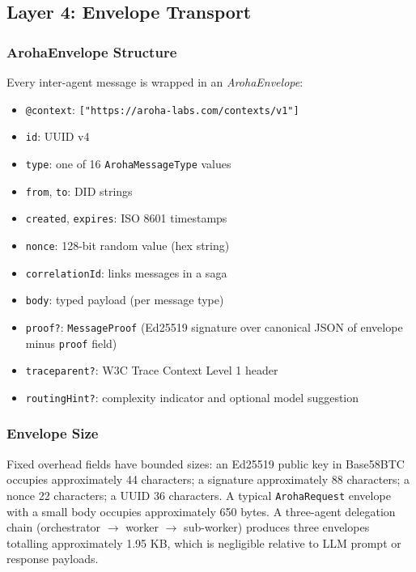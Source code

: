 \documentclass[conference]{IEEEtran}
\begin{document}
\subsection{Layer 4: Envelope Transport}
\label{sec:l4}

\subsubsection{ArohaEnvelope Structure}

Every inter-agent message is wrapped in an \textit{ArohaEnvelope}:
\begin{itemize}
  \item \texttt{@context}: \texttt{["https://aroha-labs.com/}\allowbreak\texttt{contexts/v1"]}
  \item \texttt{id}: UUID v4
  \item \texttt{type}: one of 16 \texttt{ArohaMessageType} values
  \item \texttt{from}, \texttt{to}: DID strings
  \item \texttt{created}, \texttt{expires}: ISO 8601 timestamps
  \item \texttt{nonce}: 128-bit random value (hex string)
  \item \texttt{correlationId}: links messages in a saga
  \item \texttt{body}: typed payload (per message type)
  \item \texttt{proof?}: \texttt{MessageProof} (Ed25519
    signature over canonical JSON of envelope minus
    \texttt{proof} field)
  \item \texttt{traceparent?}: W3C Trace Context Level 1
    header~\cite{w3c2021tracecontext}
  \item \texttt{routingHint?}: complexity indicator and optional
    model suggestion
\end{itemize}

\subsubsection{Envelope Size}

Fixed overhead fields have bounded sizes: an Ed25519 public key
in Base58BTC occupies approximately 44 characters; a signature
approximately 88 characters; a nonce 22 characters; a UUID 36
characters. A typical \texttt{ArohaRequest} envelope with a
small body occupies approximately 650 bytes. A three-agent
delegation chain (orchestrator $\to$ worker $\to$ sub-worker)
produces three envelopes totalling approximately 1.95 KB,
which is negligible relative to LLM prompt or response payloads.
\end{document}
